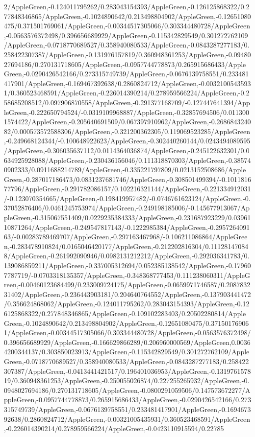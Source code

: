 {\begin{tikzternal}
{2/AppleGreen,-0.124011795262/0.283043154393/AppleGreen,-0.126125868322/0.277848346865/AppleGreen,-0.1024890642/0.213498804902/AppleGreen,-0.12651080475/0.371501769061/AppleGreen,-0.00344517305066/0.303344480728/AppleGreen,-0.0563576372498/0.396656689929/AppleGreen,-0.115342829549/0.301272762109/AppleGreen,-0.0718770689527/0.358940080533/AppleGreen,-0.0843287277183/0.258422307387/AppleGreen,-0.131976157819/0.360948361253/AppleGreen,-0.0948027694186/0.270131718605/AppleGreen,-0.0957744778873/0.265915686433/AppleGreen,-0.0290426542166/0.273315749739/AppleGreen,-0.0676139758551/0.233481417901/AppleGreen,-0.169467392638/0.2860824712/AppleGreen,-0.00321005435931/0.360523468591/AppleGreen,-0.226014390214/0.278959566224/AppleGreen,-0.258685208512/0.097906870558/AppleGreen,-0.291377168709/-0.127447641394/AppleGreen,-0.222650794524/-0.0319109968887/AppleGreen,-0.32857694506/0.0113001574422/AppleGreen,-0.205640691509/0.067397910962/AppleGreen,-0.268684324082/0.000573572588306/AppleGreen,-0.321200362305/0.119069523285/AppleGreen,-0.249668124344/-0.100648922623/AppleGreen,-0.302440260144/0.0243494089595/AppleGreen,-0.306035637112/0.0114364036874/AppleGreen,-0.245122632301/0.0634925928088/AppleGreen,-0.230436156046/0.111318870303/AppleGreen,-0.385740902333/0.0911688214789/AppleGreen,-0.335221797809/0.0213152508686/AppleGreen,-0.287017186473/0.0831237681746/AppleGreen,-0.308501499394/-0.101181677796/AppleGreen,-0.291782086157/0.102216321144/AppleGreen,-0.221334912031/-0.123070354665/AppleGreen,-0.198419957482/-0.0746761623124/AppleGreen,-0.37052876406/0.0461245753974/AppleGreen,-0.249198185006/-0.145677913067/AppleGreen,-0.315067551409/0.0229235384333/AppleGreen,-0.231687923229/0.0396110871264/AppleGreen,-0.249547817143/-0.1222985384/AppleGreen,-0.295726409163/-0.00283789469707/AppleGreen,-0.297163467968/-0.106211086864/AppleGreen,-0.283478910824/0.0165046420177/AppleGreen,-0.212202816304/0.111281470848/AppleGreen,-0.261992090946/0.0982131212212/AppleGreen,-0.292036341783/0.139086859211/AppleGreen,-0.337005312694/0.052385138542/AppleGreen,-0.179607787719/-0.0703318135357/AppleGreen,-0.348368777453/0.111238060311/AppleGreen,-0.00460123684499/0.233009724175/AppleGreen,-0.0659971746587/0.208783231402/AppleGreen,-0.236443903181/0.204640764552/AppleGreen,-0.137903441472/0.356624868062/AppleGreen,-0.124011795262/0.283043154393/AppleGreen,-0.126125868322/0.277848346865/AppleGreen,-0.109102283403/0.20502280814/AppleGreen,-0.1024890642/0.213498804902/AppleGreen,-0.12651080475/0.371501769061/AppleGreen,-0.00344517305066/0.303344480728/AppleGreen,-0.0563576372498/0.396656689929/AppleGreen,-0.166629866289/0.206960000569/AppleGreen,0.00364200344137/0.303850023913/AppleGreen,-0.115342829549/0.301272762109/AppleGreen,-0.0718770689527/0.358940080533/AppleGreen,-0.0843287277183/0.258422307387/AppleGreen,-0.0413441421517/0.196401036953/AppleGreen,-0.131976157819/0.360948361253/AppleGreen,-0.250055026874/0.227255265932/AppleGreen,-0.0948027694186/0.270131718605/AppleGreen,-0.0800291059506/0.147573672277/AppleGreen,-0.0957744778873/0.265915686433/AppleGreen,-0.0290426542166/0.273315749739/AppleGreen,-0.0676139758551/0.233481417901/AppleGreen,-0.169467392638/0.2860824712/AppleGreen,-0.00321005435931/0.360523468591/AppleGreen,-0.226014390214/0.278959566224/AppleGreen,-0.0423110915594/0.22785}
\end{tikzternal}}
